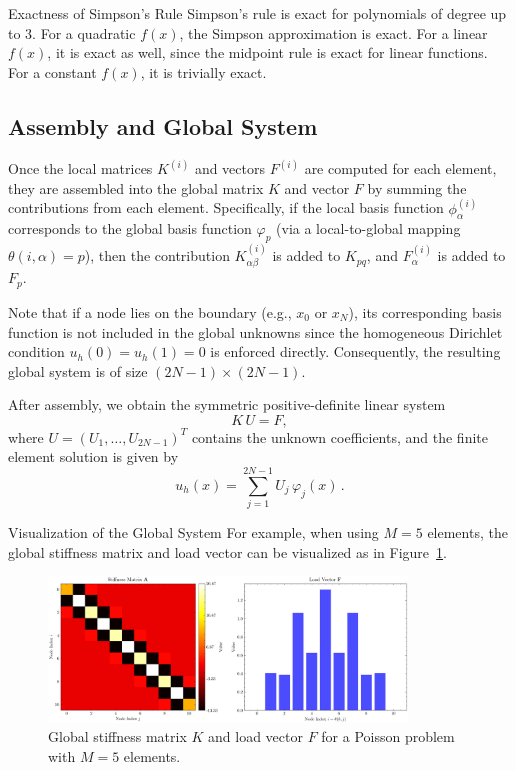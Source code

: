 \documentclass[a4paper,10pt]{article}
\begin{document}
\begin{remark}{Exactness of Simpson's Rule}{}
	Simpson's rule is exact for polynomials of degree up to 3. For a quadratic \(f(x)\), the Simpson approximation is exact. For a linear \(f(x)\), it is exact as well, since the midpoint rule is exact for linear functions. For a constant \(f(x)\), it is trivially exact.
\end{remark}

\subsection{Assembly and Global System}

Once the local matrices \(K^{(i)}\) and vectors \(F^{(i)}\) are computed for each element, they are assembled into the global matrix \(K\) and vector \(F\) by summing the contributions from each element. Specifically, if the local basis function \(\phi_\alpha^{(i)}\) corresponds to the global basis function \(\varphi_p\) (via a local-to-global mapping \(\theta(i,\alpha)=p\)), then the contribution \(K^{(i)}_{\alpha\beta}\) is added to \(K_{pq}\), and \(F^{(i)}_\alpha\) is added to \(F_p\).

Note that if a node lies on the boundary (e.g., \(x_0\) or \(x_N\)), its corresponding basis function is not included in the global unknowns since the homogeneous Dirichlet condition \(u_h(0)=u_h(1)=0\) is enforced directly. Consequently, the resulting global system is of size \((2N-1) \times (2N-1)\).

After assembly, we obtain the symmetric positive-definite linear system
\[
	K\,U = F,
\]
where \(U = (U_1,\dots,U_{2N-1})^T\) contains the unknown coefficients, and the finite element solution is given by
\[
	u_h(x)=\sum_{j=1}^{2N-1} U_j\,\varphi_j(x)\,.
\]

\begin{remark}{Visualization of the Global System}{}
	For example, when using \(M=5\) elements, the global stiffness matrix and load vector can be visualized as in Figure~\ref{fig:stiffness_load}.
	\begin{figure}[H]
		\centering
		\includegraphics[width=0.85\textwidth]{figures/stiffness_load_sine_M5.png}
		\caption{Global stiffness matrix \(K\) and load vector \(F\) for a Poisson problem with \(M=5\) elements.}
		\label{fig:stiffness_load}
	\end{figure}
\end{remark}
\end{document}
